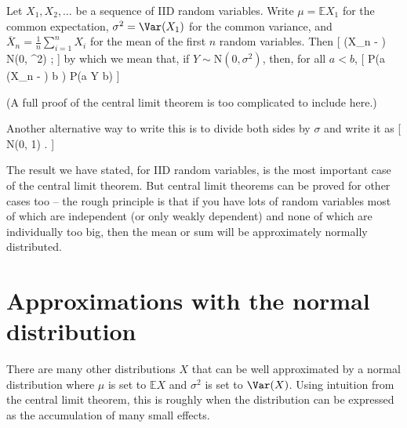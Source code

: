 \documentclass[
  letterpaper,
]{report}
\theoremstyle{definition}
\theoremstyle{definition}
\theoremstyle{remark}
\begin{document}
\leavevmode{}%
Let \(X_1, X_2, \dots\) be a sequence of IID random variables. Write
\(\mu = \mathbb EX_1\) for the common expectation,
\(\sigma^2 = \Var(X_1)\) for the common variance, and
\(\overline X_n =\frac{1}{n} \sum_{i=1}^n X_i\) for the mean of the
first \(n\) random variables. Then {[} \big(\overline X\_n -
\mu\big) \to \mathrm N(0, \sigma\^{}2)
\quad {}; {]} by which we mean
that, if \(Y \sim \mathrm N(0, \sigma^2)\), then, for all \(a < b\), {[}
\mathbb P\left(a \leq {}\big(\overline X\_n - \mu\big) \leq b
\right) \to \mathbb P(a \leq Y \leq b) \quad {} {]}

(A full proof of the central limit theorem is too complicated to include
here.)

Another alternative way to write this is to divide both sides by
\(\sigma\) and write it as {[}
 \to \mathrm N(0, 1)
\quad {}. {]}

The result we have stated, for IID random variables, is the most
important case of the central limit theorem. But central limit theorems
can be proved for other cases too -- the rough principle is that if you
have lots of random variables most of which are independent (or only
weakly dependent) and none of which are individually too big, then the
mean or sum will be approximately normally distributed.

\hypertarget{normal-approx}{%
\section{Approximations with the normal
distribution}\label{normal-approx}}

There are many other distributions \(X\) that can be well approximated
by a normal distribution where \(\mu\) is set to \(\mathbb EX\) and
\(\sigma^2\) is set to \(\Var(X)\). Using intuition from the central
limit theorem, this is roughly when the distribution can be expressed as
the accumulation of many small effects.
\end{document}

